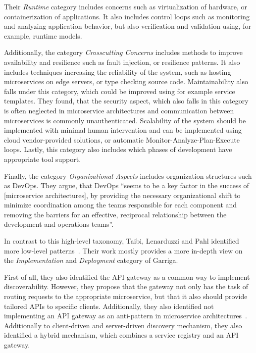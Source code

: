 Their \textit{Runtime} category includes concerns such as virtualization of hardware, or containerization of applications.
It also includes control loops such as monitoring and analyzing application behavior, but also verification and validation using, for example, runtime models.

Additionally, the category \textit{Crosscutting Concerns} includes methods to improve availability and resilience such as fault injection, or resilience patterns.
It also includes techniques increasing the reliability of the system, such as hosting microservices on edge servers, or type checking source code.
Maintainability also falls under this category, which could be improved using for example service templates.
They found, that the security aspect, which also falls in this category is often neglected in microservice architectures and communication between microservices is commonly unauthenticated.
Scalability of the system should be implemented with minimal human intervention and can be implemented using cloud vendor-provided solutions, or automatic Monitor-Analyze-Plan-Execute loops.
Lastly, this category also includes which phases of development have appropriate tool support.

Finally, the category \textit{Organizational Aspects} includes organization structures such as {DevOps}.
They argue, that DevOps ``seems to be a key factor in the success of [microservice architectures], by providing the necessary organizational shift to minimize coordination among the teams responsible for each component and removing the barriers for an effective, reciprocal relationship between the development and operations teams''.

In contrast to this high-level taxonomy, Taibi, Lenarduzzi and Pahl identified more low-level patterns~\cite{Taibi2018}.
Their work mostly provides a more in-depth view on the \textit{Implementation} and \textit{Deployment} category of Garriga.

First of all, they also identified the \ac{API} gateway as a common way to implement discoverability.
However, they propose that the gateway not only has the task of routing requests to the appropriate microservice, but that it also should provide tailored \acp{API} to specific clients.
Additionally, they also identified not implementing an \ac{API} gateway as an anti-pattern in microservice architectures~\cite{Taibi2020}.
Additionally to client-driven and server-driven discovery mechanism, they also identified a hybrid mechanism, which combines a service registry and an \ac{API} gateway.


